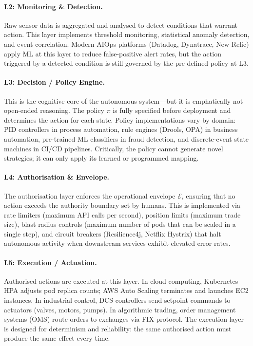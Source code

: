 \documentclass[12pt, a4paper]{article}
\begin{document}
\paragraph{L2: Monitoring \& Detection.}
Raw sensor data is aggregated and analysed to detect conditions that warrant action. This layer implements threshold monitoring, statistical anomaly detection, and event correlation. Modern AIOps platforms (Datadog, Dynatrace, New Relic) apply ML at this layer to reduce false-positive alert rates, but the action triggered by a detected condition is still governed by the pre-defined policy at L3.

\paragraph{L3: Decision / Policy Engine.}
This is the cognitive core of the autonomous system---but it is emphatically not open-ended reasoning. The policy $\pi$ is fully specified before deployment and determines the action for each state. Policy implementations vary by domain: PID controllers in process automation, rule engines (Drools, OPA) in business automation, pre-trained ML classifiers in fraud detection, and discrete-event state machines in CI/CD pipelines. Critically, the policy cannot generate novel strategies; it can only apply its learned or programmed mapping.

\paragraph{L4: Authorisation \& Envelope.}
The authorisation layer enforces the operational envelope $\mathcal{E}$, ensuring that no action exceeds the authority boundary set by humans. This is implemented via rate limiters (maximum API calls per second), position limits (maximum trade size), blast radius controls (maximum number of pods that can be scaled in a single step), and circuit breakers (Resilience4j, Netflix Hystrix) that halt autonomous activity when downstream services exhibit elevated error rates.

\paragraph{L5: Execution / Actuation.}
Authorised actions are executed at this layer. In cloud computing, Kubernetes HPA adjusts pod replica counts; AWS Auto Scaling terminates and launches EC2 instances. In industrial control, DCS controllers send setpoint commands to actuators (valves, motors, pumps). In algorithmic trading, order management systems (OMS) route orders to exchanges via FIX protocol. The execution layer is designed for determinism and reliability: the same authorised action must produce the same effect every time.
\end{document}
